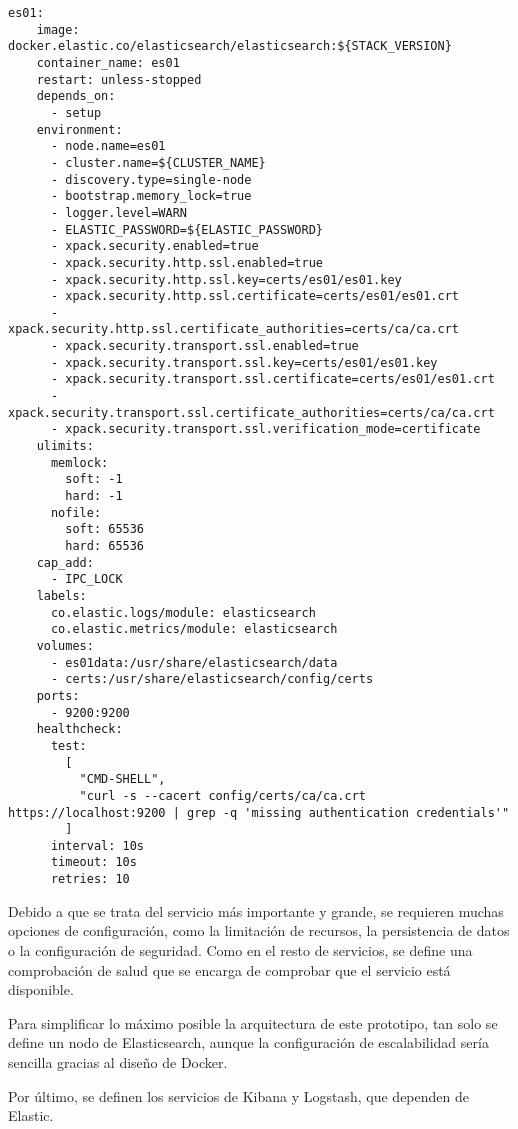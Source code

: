\begin{lstlisting}[style=yaml, caption={Definición del servicio de Elasticsearch}]
es01:
    image: docker.elastic.co/elasticsearch/elasticsearch:${STACK_VERSION}
    container_name: es01
    restart: unless-stopped
    depends_on:
      - setup
    environment:
      - node.name=es01
      - cluster.name=${CLUSTER_NAME}
      - discovery.type=single-node
      - bootstrap.memory_lock=true
      - logger.level=WARN
      - ELASTIC_PASSWORD=${ELASTIC_PASSWORD}
      - xpack.security.enabled=true
      - xpack.security.http.ssl.enabled=true
      - xpack.security.http.ssl.key=certs/es01/es01.key
      - xpack.security.http.ssl.certificate=certs/es01/es01.crt
      - xpack.security.http.ssl.certificate_authorities=certs/ca/ca.crt
      - xpack.security.transport.ssl.enabled=true
      - xpack.security.transport.ssl.key=certs/es01/es01.key
      - xpack.security.transport.ssl.certificate=certs/es01/es01.crt
      - xpack.security.transport.ssl.certificate_authorities=certs/ca/ca.crt
      - xpack.security.transport.ssl.verification_mode=certificate
    ulimits:
      memlock:
        soft: -1
        hard: -1
      nofile:
        soft: 65536
        hard: 65536
    cap_add:
      - IPC_LOCK
    labels:
      co.elastic.logs/module: elasticsearch
      co.elastic.metrics/module: elasticsearch
    volumes:
      - es01data:/usr/share/elasticsearch/data
      - certs:/usr/share/elasticsearch/config/certs
    ports:
      - 9200:9200
    healthcheck:
      test:
        [
          "CMD-SHELL",
          "curl -s --cacert config/certs/ca/ca.crt https://localhost:9200 | grep -q 'missing authentication credentials'"
        ]
      interval: 10s
      timeout: 10s
      retries: 10
\end{lstlisting}

Debido a que se trata del servicio más importante y grande, se requieren muchas
opciones de configuración, como la limitación de recursos, la persistencia de
datos o la configuración de seguridad. Como en el resto de servicios, se define
una comprobación de salud que se encarga de comprobar que el servicio está
disponible.

Para simplificar lo máximo posible la arquitectura de este prototipo, tan solo
se define un nodo de Elasticsearch, aunque la configuración de escalabilidad
sería sencilla gracias al diseño de Docker.

Por último, se definen los servicios de Kibana y Logstash, que dependen de
Elastic.

